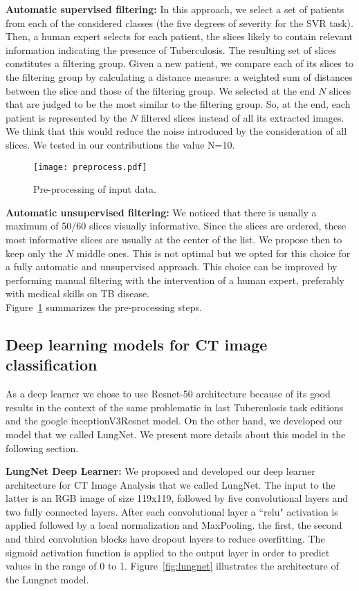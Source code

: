 \textbf{Automatic supervised filtering:} In this approach, we select a set of patients from each of the considered classes (the five degrees of severity for the SVR task). Then, a human expert selects for each patient, the slices likely to contain relevant information indicating the presence of Tuberculosis. The resulting set of slices constitutes a filtering group. Given a new patient, we compare each of its slices to the filtering group by calculating a distance measure:  a weighted sum of distances between the slice and those of the filtering group. We selected at the end $N$ slices that are judged to be the most similar to the filtering group. So, at the end, each patient is represented by the $N$ filtered slices instead of all its extracted images. We think that this would reduce the noise introduced by the consideration of all slices. We tested in our contributions the value N=10.

\begin{figure}
\texttt{[image: preprocess.pdf]}
\caption{Pre-processing of input data.} 
\label{fig:preprocess}
\end{figure}

\textbf{Automatic unsupervised filtering:}
We noticed that there is usually a maximum of 50/60 slices visually informative. Since the slices are ordered, these most informative slices  are usually at the center of the list. We propose then to keep only the $N$ middle ones. This is not optimal but we opted for this choice for a fully automatic and unsupervised approach. This choice can be improved by performing manual filtering with the intervention of a human expert, preferably with medical skills on TB disease.\\

Figure~\ref{fig:preprocess} summarizes the pre-processing steps.
\subsection{Deep learning models for CT image classification}
As a deep learner we chose to use Resnet-50 architecture because of its good results in the context of the same problematic in last Tuberculosis task editions~\cite{sgeast17} and the google inceptionV3Resnet model. On the other hand, we developed our model that we called LungNet. We present more details about this model in the following section.

\textbf{LungNet Deep Learner:}
We proposed and developed our deep learner architecture for CT Image Analysis that we called LungNet. The input to the latter is an RGB image of size 119x119, followed by five convolutional layers and two fully connected layers. After each convolutional layer a ``relu" activation is applied followed by a local normalization and MaxPooling. the first, the second and third convolution blocks have dropout layers to reduce overfitting. The sigmoid activation function is applied to the output layer in order to predict values in the range of 0 to 1. Figure~\ref{fig:lungnet} illustrates the architecture of the Lungnet model.

